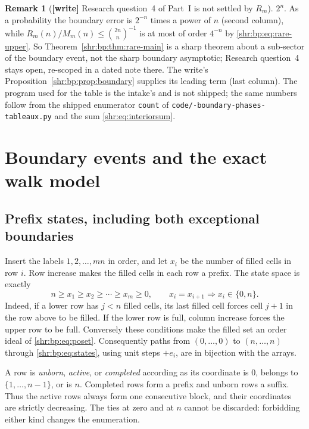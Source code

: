 \documentclass[11pt,letterpaper]{article}
\numberwithin{equation}{section}
\theoremstyle{definition}
\newtheorem{remark}[theorem]{Remark}
\newcommand{\1}{\mathbf 1}
\begin{document}
\begin{remark}[\textbf{[write]} Research question~4 of Part~I is not settled by $R_m$]
$2^n$. As a probability the boundary error is $2^{-n}$ times a power of
$n$ (second column), while $R_m(n)/M_m(n)\le\binom{2n}n^{-1}$ is at most
of order $4^{-n}$ by \eqref{shr:bp:eq:rare-upper}. So Theorem~\ref{shr:bp:thm:rare-main} is a
sharp theorem about a sub-sector of the boundary event, not the sharp
boundary asymptotic; Research question~4 stays open, re-scoped in a dated
note there. The write's Proposition~\ref{shr:bp:prop:boundary} supplies
its leading term (last column). The program used for the table is the
intake's and is not shipped; the same numbers follow from the shipped
enumerator \texttt{count} of \texttt{code/-boundary-phases-tableaux.py}
and the sum \eqref{shr:eq:interiorsum}.
\end{remark}

\section{Boundary events and the exact walk model}
\label{shr:bp:sec:events}

\subsection{Prefix states, including both exceptional boundaries}
Insert the labels $1,2,\ldots,mn$ in order, and let $x_i$ be the number of
filled cells in row $i$. Row increase makes the filled cells in each row
a prefix. The state space is exactly
\begin{equation}
 n\ge x_1\ge x_2\ge\cdots\ge x_m\ge0,
 \qquad x_i=x_{i+1}\Longrightarrow x_i\in\{0,n\}.
 \label{shr:bp:eq:states}
\end{equation}
Indeed, if a lower row has $j<n$ filled cells, its last filled cell forces
cell $j+1$ in the row above to be filled. If the lower row is full, column
increase forces the upper row to be full. Conversely these conditions
make the filled set an order ideal of \eqref{shr:bp:eq:poset}. Consequently paths
from $(0,\ldots,0)$ to $(n,\ldots,n)$ through \eqref{shr:bp:eq:states}, using unit
steps $+e_i$, are in bijection with the arrays.

A row is \emph{unborn}, \emph{active}, or \emph{completed} according as
its coordinate is $0$, belongs to $\{1,\ldots,n-1\}$, or is $n$.
Completed rows form a prefix and unborn rows a suffix. Thus the active rows
always form one consecutive block, and their coordinates are strictly
decreasing. The ties at zero and at $n$ cannot be discarded: forbidding
either kind changes the enumeration.
\end{document}
